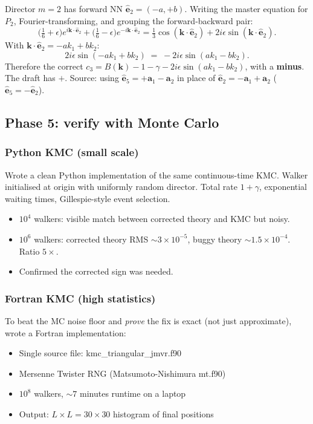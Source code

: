 \documentclass[11pt,a4paper]{article}
\newcommand{\vk}{\mathbf{k}}
\newcommand{\va}[1]{\mathbf{a}_{#1}}
\newcommand{\veps}[1]{\hat{\mathbf{e}}_{#1}}
\begin{document}
Director $m = 2$ has forward NN $\veps{2} = (-a, +b)$. Writing the
master equation for $P_2$, Fourier-transforming, and grouping the
forward-backward pair:
\[
\big(\tfrac{1}{6}+\epsilon\big) e^{i \vk \cdot \veps{2}} + \big(\tfrac{1}{6}-\epsilon\big) e^{-i \vk \cdot \veps{2}}
= \tfrac{1}{3}\cos(\vk\cdot \veps{2}) + 2 i \epsilon \sin(\vk\cdot \veps{2}).
\]
With $\vk\cdot\veps{2} = -a k_1 + b k_2$:
\[
2 i \epsilon \sin(-a k_1 + b k_2) \;=\; -2 i \epsilon \sin(a k_1 - b k_2).
\]
Therefore the correct $c_3 = B(\vk) - 1 - \gamma - 2 i \epsilon \sin(a k_1 - b k_2)$,
with a \textbf{minus}. The draft has $+$. Source: using $\veps{5} = +\va{1} - \va{2}$
in place of $\veps{2} = -\va{1} + \va{2}$ ($\veps{5} = -\veps{2}$).

\subsection{Phase 5: verify with Monte Carlo}\label{ssec:phase5}

\subsubsection{Python KMC (small scale)}\label{sssec:py-kmc}

Wrote a clean Python implementation of the same continuous-time KMC.
Walker initialised at origin with uniformly random director. Total
rate $1 + \gamma$, exponential waiting times, Gillespie-style event
selection.

\begin{itemize}[leftmargin=*,nosep]
\item $10^4$ walkers: visible match between corrected theory and KMC
  but noisy.
\item $10^6$ walkers: corrected theory RMS $\sim 3\times10^{-5}$,
  buggy theory $\sim 1.5\times10^{-4}$. Ratio $5\times$.
\item Confirmed the corrected sign was needed.
\end{itemize}

\subsubsection{Fortran KMC (high statistics)}\label{sssec:fortran-kmc}

To beat the MC noise floor and \emph{prove} the fix is exact (not just
approximate), wrote a Fortran implementation:
\begin{itemize}[leftmargin=*,nosep]
\item Single source file: {\sf kmc\_triangular\_jmvr.f90}
\item Mersenne Twister RNG (Matsumoto-Nishimura {\sf mt.f90})
\item $10^8$ walkers, $\sim 7$ minutes runtime on a laptop
\item Output: $L \times L = 30 \times 30$ histogram of final positions
\end{itemize}
\end{document}
